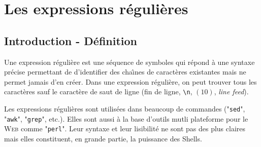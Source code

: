 %
%

\setcounter{remarque-cnt}{1}
\setcounter{example-cnt}{1}
\chapter{\label{reg-exp}Les expressions r{\'e}guli{\`e}res}

\section{Introduction - D{\'e}finition}

Une expression r{\'e}guli{\`e}re est
une s{\'e}quence de symboles qui r{\'e}pond {\`a} une syntaxe
pr{\'e}cise permettant de d'identifier des cha{\^\i}nes de
caract{\`e}res existantes mais ne permet jamais d'en cr{\'e}er. Dans une
expression r{\'e}guli{\`e}re, on peut trouver tous les caract{\`e}res
sauf le caract{\`e}re de saut de ligne (fin de ligne, \verb=\n=,
{\ASCII}$(10)$, \textsl{line feed}).

Les expressions r{\'e}guli{\`e}res sont utilis{\'e}es dans beaucoup de commandes
{\Unix} ("\texttt{sed}",
"\texttt{awk}", "\texttt{grep}",
etc.). Elles sont aussi {\`a} la base d'outils mutli plateforme pour le \textsc{Web}
comme "\texttt{perl}"\cite{learning-perl,programming-perl,advpgm-perl}.
Leur syntaxe et leur lisibilit{\'e} ne sont pas des plus claires mais elles
constituent, en grande partie, la puissance des Shells.

